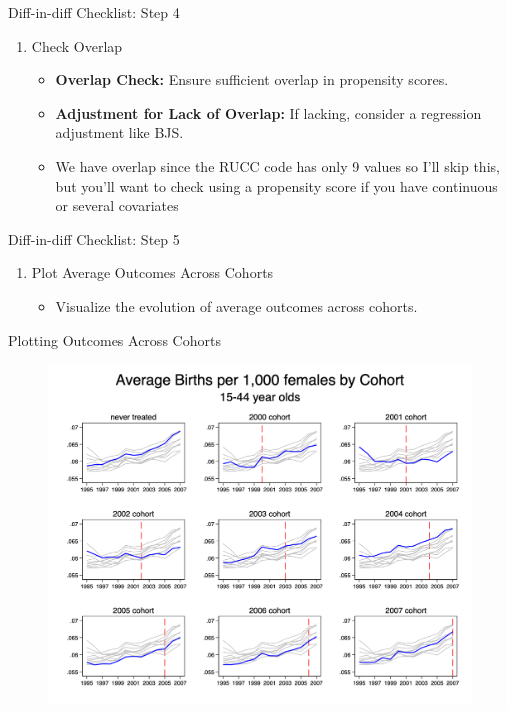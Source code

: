 \documentclass{beamer}
\begin{document}
\begin{frame}{Diff-in-diff Checklist: Step 4}
\begin{enumerate}
\item[4. ] Check Overlap
    \begin{itemize}
        \item \textbf{Overlap Check:} Ensure sufficient overlap in propensity scores.
        \item \textbf{Adjustment for Lack of Overlap:} If lacking, consider a regression adjustment like BJS.
        \item We have overlap since the RUCC code has only 9 values so I'll skip this, but you'll want to check using a propensity score if you have continuous or several covariates
    \end{itemize}
   \end{enumerate}
\end{frame}




\begin{frame}{Diff-in-diff Checklist: Step 5}
\begin{enumerate}
\item[5. ] Plot Average Outcomes Across Cohorts
    \begin{itemize}
        \item Visualize the evolution of average outcomes across cohorts.
    \end{itemize}
   \end{enumerate}
\end{frame}



\begin{frame}{Plotting Outcomes Across Cohorts}

\begin{figure}[ht]
    \centering
    \includegraphics[width=\linewidth, height=0.8\textheight, keepaspectratio]{./lecture_includes/pretty_outcomes.png}
\end{figure}

\end{frame}
\end{document}
